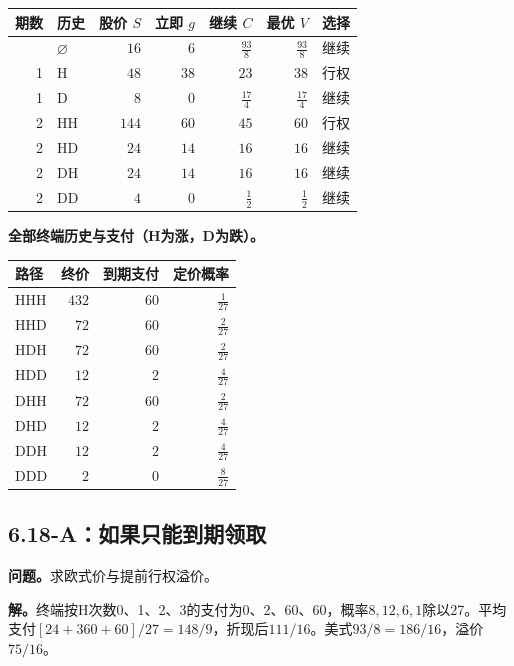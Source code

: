 \documentclass[11pt,a4paper,UTF8,fontset=fandol]{ctexart}
\begin{document}
\begin{longtable}[]{@{}rlrrrrl@{}}
\toprule\noalign{}
期数 & 历史 & 股价 \(S\) & 立即 \(g\) & 继续 \(C\) & 最优 \(V\) &
选择 \\
\midrule\noalign{}
\endhead
\bottomrule\noalign{}
\endlastfoot
0 & \(\varnothing\) & \(16\) & \(6\) & \(\frac{93}{8}\) &
\(\frac{93}{8}\) & 继续 \\
1 & H & \(48\) & \(38\) & \(23\) & \(38\) & 行权 \\
1 & D & \(8\) & \(0\) & \(\frac{17}{4}\) & \(\frac{17}{4}\) & 继续 \\
2 & HH & \(144\) & \(60\) & \(45\) & \(60\) & 行权 \\
2 & HD & \(24\) & \(14\) & \(16\) & \(16\) & 继续 \\
2 & DH & \(24\) & \(14\) & \(16\) & \(16\) & 继续 \\
2 & DD & \(4\) & \(0\) & \(\frac{1}{2}\) & \(\frac{1}{2}\) & 继续 \\
\end{longtable}

\textbf{全部终端历史与支付（H为涨，D为跌）。}

\begin{longtable}[]{@{}lrrr@{}}
\toprule\noalign{}
路径 & 终价 & 到期支付 & 定价概率 \\
\midrule\noalign{}
\endhead
\bottomrule\noalign{}
\endlastfoot
HHH & \(432\) & \(60\) & \(\frac{1}{27}\) \\
HHD & \(72\) & \(60\) & \(\frac{2}{27}\) \\
HDH & \(72\) & \(60\) & \(\frac{2}{27}\) \\
HDD & \(12\) & \(2\) & \(\frac{4}{27}\) \\
DHH & \(72\) & \(60\) & \(\frac{2}{27}\) \\
DHD & \(12\) & \(2\) & \(\frac{4}{27}\) \\
DDH & \(12\) & \(2\) & \(\frac{4}{27}\) \\
DDD & \(2\) & \(0\) & \(\frac{8}{27}\) \\
\end{longtable}

\endgroup

\subsection{6.18-A：如果只能到期领取}\label{aux5982ux679cux53eaux80fdux5230ux671fux9886ux53d6}

\textbf{问题。}求欧式价与提前行权溢价。

\textbf{解。}终端按H次数0、1、2、3的支付为0、2、60、60，概率\(8,12,6,1\)除以27。平均支付\([24+360+60]/27=148/9\)，折现后\(\boxed{111/16}\)。美式\(93/8=186/16\)，溢价\(\boxed{75/16}\)。
\end{document}
